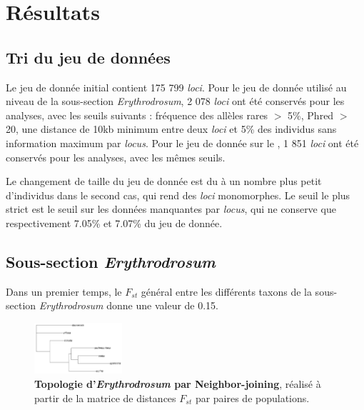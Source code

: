 \section{Résultats}

\subsection{Tri du jeu de données}

Le jeu de donnée initial contient 175 799 \textit{loci}. Pour le jeu de donnée utilisé au niveau de la sous-section \textit{Erythrodrosum}, 2 078 \textit{loci} ont été conservés pour les analyses, avec les seuils suivants :  fréquence des allèles rares $>$ 5\%, Phred $>$ 20, une distance de 10kb minimum entre deux \textit{loci} et 5\% des individus sans information maximum par \textit{locus}.
Pour le jeu de donnée sur le , 1 851 \textit{loci} ont été conservés pour les analyses, avec les mêmes seuils.

Le changement de taille du jeu de donnée est du à un nombre plus petit d'individus dans le second cas, qui rend des \textit{loci} monomorphes. Le seuil le plus strict est le seuil sur les données manquantes par \textit{locus}, qui ne conserve que  respectivement 7.05\% et 7.07\% du jeu de donnée. 

\subsection{Sous-section \textit{Erythrodrosum}}

Dans un premier temps, le $F_{st}$ général entre les différents taxons de la sous-section \textit{Erythrodrosum} donne une valeur de 0.15.%

\begin{figure}
	\vspace{-20pt}
	\begin{center}
	\includegraphics[width=0.29\textwidth]{fig/topologie.png}
	\end{center}
	\caption{\textbf{Topologie d'\textit{Erythrodrosum} par Neighbor-joining}, réalisé à partir de la matrice de distances $F_{st}$ par paires de populations.}
    \label{topologie}
\end{figure}

